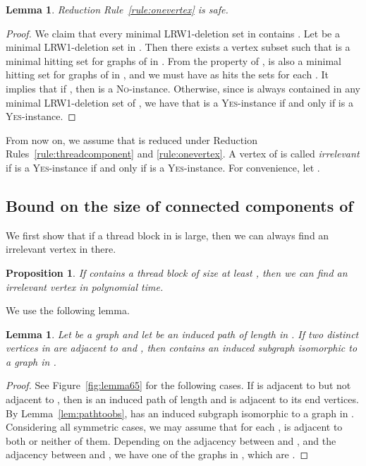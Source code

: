 \documentclass[11pt]{article}
\newtheorem{lemma}[theorem]{Lemma}
\newtheorem{proposition}[theorem]{Proposition}
\theoremstyle{remark}
\newcommand{\YES}{\textsc{Yes}}
\newcommand{\NO}{\textsc{No}}
\begin{document}
\begin{lemma}\label{lem:oneintersect}
 Reduction Rule~\ref{rule:onevertex} is safe.
\end{lemma}
\begin{proof}
We claim that every minimal LRW1-deletion set in  contains .
Let  be a minimal LRW1-deletion set in . Then there exists a vertex subset  such that  is a minimal hitting set for graphs of  in . 
From the property of ,  is also a minimal hitting set for graphs of  in , and we must have  as  hits the sets  for each .
It implies that if , then  is a \NO-instance.
Otherwise, since  is always contained in any minimal LRW1-deletion set of , we have that   is a \textsc{Yes}-instance if and only if  is a \textsc{Yes}-instance.
\end{proof}

From now on, we assume that  is reduced under Reduction Rules~\ref{rule:threadcomponent} and \ref{rule:onevertex}.
A  vertex  of  is called \emph{irrelevant} if  is a \YES-instance if and only if  is a \YES-instance. 
For convenience, let .



\subsection{Bound on the size of connected components of }\label{subsec:boundcomp}


We first show that if a thread block in
 is large, then we can always find an irrelevant vertex in there.

\begin{proposition}\label{prop:irrelevant} If  contains a thread block of size at least , then we can find an irrelevant vertex
  in polynomial time.
\end{proposition}

We use the following lemma.

\begin{lemma}\label{lem:diamond}
Let  be a graph and let  be an induced path of length  in .
If two distinct vertices  in  are adjacent to  and ,
then  contains an induced subgraph isomorphic to a graph in . 
\end{lemma}
\begin{proof}
See Figure~\ref{fig:lemma65} for the following cases.
If  is adjacent to  but not adjacent to , then  is an induced path of length  and  is adjacent to its end vertices.
By Lemma~\ref{lem:pathtoobs},  has an induced subgraph isomorphic to a graph in .
Considering all symmetric cases, we may assume that 
for each , 
 is adjacent to both  or neither of them.
Depending on the adjacency between  and , and the adjacency between  and , we have one of the  graphs in , which are .
\end{proof}
\end{document}
